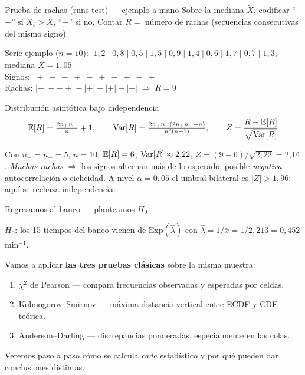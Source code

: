 \documentclass[aspectratio=1610, 10pt]{beamer}
\begin{document}
\begin{frame}{Prueba de rachas (runs test) — ejemplo a mano}
  Sobre la mediana $\tilde X$, codificar ``$+$'' si $X_i>\tilde X$, ``$-$'' si no.
  Contar $R=$ número de rachas (secuencias consecutivas del mismo signo).

  \begin{center}\small
    Serie ejemplo ($n=10$):
    $\;1{,}2\;|\;0{,}8\;|\;0{,}5\;|\;1{,}5\;|\;0{,}9\;|\;1{,}4\;|\;0{,}6\;|\;1{,}7\;|\;0{,}7\;|\;1{,}3$,
    \quad mediana $\tilde X = 1{,}05$\\[3pt]
    Signos: $\;+\; -\; -\; +\; -\; +\; -\; +\; -\; +$ \\[3pt]
    Rachas: $|+|--|+|-|+|-|+|-|+|\;\Rightarrow\; R = 9$
  \end{center}

  \begin{block}{Distribución asintótica bajo independencia}
    \[
      \mathbb{E}[R]=\tfrac{2n_+ n_-}{n}+1,\qquad \operatorname{Var}[R]=\tfrac{2n_+n_-(2n_+n_- - n)}{n^2(n-1)},
      \qquad Z=\frac{R-\mathbb{E}[R]}{\sqrt{\operatorname{Var}[R]}}
    \]
  \end{block}

  \footnotesize
  Con $n_+=n_-=5$, $n=10$: $\mathbb{E}[R]=6$, $\operatorname{Var}[R]\approx 2{,}22$, $Z=(9-6)/\sqrt{2{,}22}=2{,}01$.
  \emph{Muchas rachas} $\Rightarrow$ los signos alternan más de lo esperado; posible
  \emph{negativa} autocorrelación o ciclicidad.
  A nivel $\alpha=0{,}05$ el umbral bilateral es $|Z|>1{,}96$: aquí se rechaza independencia.
\end{frame}


\begin{frame}{Regresamos al banco — planteamos $H_0$}
  \begin{situacionbox}
    $H_0$: los 15 tiempos del banco vienen de $\mathrm{Exp}(\hat\lambda)$
    con $\hat\lambda = 1/\bar x = 1/2{,}213 = 0{,}452$ min$^{-1}$.
  \end{situacionbox}

  Vamos a aplicar \textbf{las tres pruebas clásicas} sobre la misma muestra:

  \begin{enumerate}\small
    \item $\chi^2$ de Pearson — compara frecuencias observadas y esperadas por celdas.
    \item Kolmogorov--Smirnov — máxima distancia vertical entre ECDF y CDF teórica.
    \item Anderson--Darling — discrepancias ponderadas, especialmente en las colas.
  \end{enumerate}

  \vspace{4pt}
  Veremos paso a paso cómo se calcula \emph{cada} estadístico y por qué pueden dar
  conclusiones distintas.
\end{frame}
\end{document}
